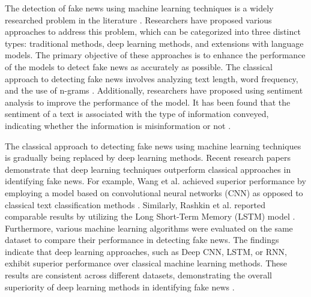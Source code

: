 The detection of fake news using machine learning techniques is a widely researched problem in the literature \autocite{Pathak2020}. Researchers have proposed various approaches to address this problem, which can be categorized into three distinct types: traditional methods, deep learning methods, and extensions with language models. The primary objective of these approaches is to enhance the performance of the models to detect fake news as accurately as possible. The classical approach to detecting fake news involves analyzing text length, word frequency, and the use of n-grams \autocite{Shu2017}. Additionally, researchers have proposed using sentiment analysis to improve the performance of the model. It has been found that the sentiment of a text is associated with the type of information conveyed, indicating whether the information is misinformation or not \autocite{rubin2016fake}.

The classical approach to detecting fake news using machine learning techniques is gradually being replaced by deep learning methods. Recent research papers demonstrate that deep learning techniques outperform classical approaches in identifying fake news. For example, Wang et al. achieved superior performance by employing a model based on convolutional neural networks (CNN) as opposed to classical text classification methods \autocite{wang-2017-liar}. Similarly, Rashkin et al. reported comparable results by utilizing the Long Short-Term Memory (LSTM) model \autocite{rashkin-etal-2017-truth}. Furthermore, various machine learning algorithms were evaluated on the same dataset to compare their performance in detecting fake news. The findings indicate that deep learning approaches, such as Deep CNN, LSTM, or RNN, exhibit superior performance over classical machine learning methods. These results are consistent across different datasets, demonstrating the overall superiority of deep learning methods in identifying fake news \autocite{IEEE2021}. 

